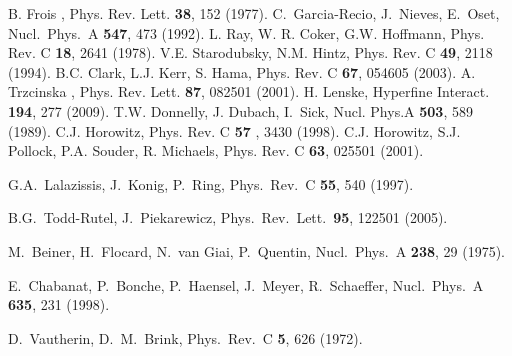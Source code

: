
B. Frois \etal, Phys. Rev. Lett. {\bf 38}, 152 (1977).
C.~Garcia-Recio, J.~Nieves, E.~Oset,
 Nucl.\ Phys.\  A {\bf 547}, 473 (1992).
 L. Ray, W. R. Coker, G.W. Hoffmann, Phys. Rev. C {\bf 18}, 2641 (1978).
 V.E. Starodubsky, N.M. Hintz, Phys. Rev. C {\bf 49}, 2118 (1994).
 B.C. Clark, L.J. Kerr, S. Hama, Phys. Rev. C {\bf 67}, 054605 (2003). 
 A. Trzcinska \etal, Phys. Rev. Lett. {\bf 87}, 082501 (2001).
 H. Lenske, Hyperfine Interact. {\bf 194}, 277 (2009).
 T.W. Donnelly, J. Dubach, I.~Sick, Nucl. Phys.A {\bf 503}, 589 (1989).
 C.J. Horowitz, Phys. Rev. C {\bf 57} , 3430 (1998).
 C.J. Horowitz, S.J. Pollock, P.A. Souder, R. Michaels, Phys. Rev. C {\bf 63}, 025501 (2001).

  G.A.~Lalazissis, J.~Konig, P.~Ring,
  Phys.\ Rev.\ C {\bf 55}, 540 (1997).

  B.G.~Todd-Rutel, J.~Piekarewicz,
  Phys.\ Rev.\ Lett.\  {\bf 95}, 122501 (2005).
  


  M.~Beiner, H.~Flocard, N.~van Giai, P.~Quentin,
  Nucl.\ Phys.\  A {\bf 238}, 29 (1975).
 
  E.~Chabanat, P.~Bonche, P.~Haensel, J.~Meyer, R.~Schaeffer,
  Nucl.\ Phys.\ A {\bf 635}, 231 (1998).
  
  D.~Vautherin, D.~M.~Brink,
  Phys.\ Rev.\  C {\bf 5}, 626 (1972).
  


